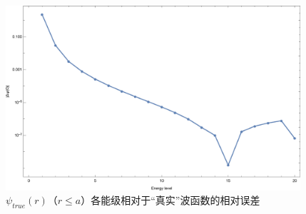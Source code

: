 \documentclass[8pt]{beamer}
\begin{document}
\begin{frame}
\begin{figure}[!htbp]
	\centering
	\includegraphics[width=4.3in]{psir1.eps}
	\caption{$\psi_{true}(r)$（$r\leq a$）各能级相对于“真实”波函数的相对误差}\label{psir}
\end{figure}
\end{frame}
%
%
\end{document}
